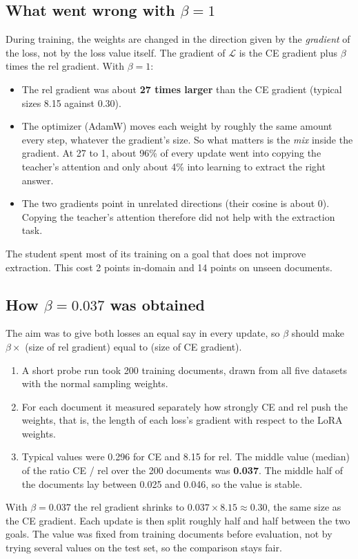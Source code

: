 \documentclass[10pt]{article}
\begin{document}
\subsection*{What went wrong with $\beta = 1$}

During training, the weights are changed in the direction given by the \emph{gradient} of the loss, not by the loss value itself. The gradient of $\mathcal{L}$ is the CE gradient plus $\beta$ times the rel gradient. With $\beta = 1$:
\begin{itemize}
  \item The rel gradient was about \textbf{27 times larger} than the CE gradient (typical sizes 8.15 against 0.30).
  \item The optimizer (AdamW) moves each weight by roughly the same amount every step, whatever the gradient's size. So what matters is the \emph{mix} inside the gradient. At 27 to 1, about 96\% of every update went into copying the teacher's attention and only about 4\% into learning to extract the right answer.
  \item The two gradients point in unrelated directions (their cosine is about 0). Copying the teacher's attention therefore did not help with the extraction task.
\end{itemize}
The student spent most of its training on a goal that does not improve extraction. This cost 2 points in-domain and 14 points on unseen documents.

\subsection*{How $\beta = 0.037$ was obtained}

The aim was to give both losses an equal say in every update, so $\beta$ should make $\beta \times$ (size of rel gradient) equal to (size of CE gradient).
\begin{enumerate}
  \item A short probe run took 200 training documents, drawn from all five datasets with the normal sampling weights.
  \item For each document it measured separately how strongly CE and rel push the weights, that is, the length of each loss's gradient with respect to the LoRA weights.
  \item Typical values were 0.296 for CE and 8.15 for rel. The middle value (median) of the ratio CE / rel over the 200 documents was \textbf{0.037}. The middle half of the documents lay between 0.025 and 0.046, so the value is stable.
\end{enumerate}
With $\beta = 0.037$ the rel gradient shrinks to $0.037 \times 8.15 \approx 0.30$, the same size as the CE gradient. Each update is then split roughly half and half between the two goals. The value was fixed from training documents before evaluation, not by trying several values on the test set, so the comparison stays fair.
\end{document}
